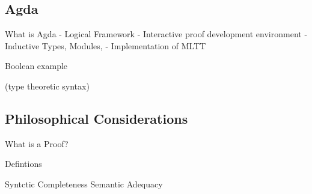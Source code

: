 \documentclass{beamer}
\begin{document}
\subsection{Agda}

\begin{frame}

What is Agda
- Logical Framework
- Interactive proof development environment
- Inductive Types, Modules,
- Implementation of MLTT

\end{frame}

\begin{frame}
Boolean example

(type theoretic syntax)

\end{frame}

\subsection{Philosophical Considerations}


\begin{frame}

  What is a Proof?
  
\end{frame}

\begin{frame}

  Defintions

  Syntctic Completeness
  Semantic Adequacy

\end{frame}

\begin{frame}[fragile]
\centering
{}

\end{frame}
\end{document}
